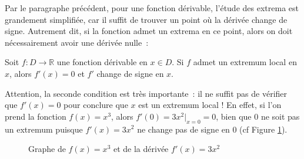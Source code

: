 Par le paragraphe précédent, pour une fonction dérivable, l'étude des extrema est grandement simplifiée, car il suffit de trouver un point où la dérivée change de signe. Autrement dit, si la fonction admet un extrema en ce point, alors on doit nécessairement avoir une dérivée nulle~:
\begin{boxthm}
Soit $f : D \to \mathbb{R}$ une fonction dérivable en $x \in D$. Si $f$ admet un extremum local en $x$, alors $f'(x) = 0$ et $f'$ change de signe en $x$.
\end{boxthm}
Attention, la seconde condition est très importante~: il ne suffit pas de vérifier que $f'(x) = 0$ pour conclure que $x$ est un extremum local ! En effet, si l'on prend la fonction $f(x) = x^3$, alors $f'(0) = 3x^2\big|_{x = 0} = 0$, bien que $0$ ne soit pas un extremum puisque $f'(x) = 3x^2$ ne change pas de signe en $0$ (cf Figure \ref{fig:x_cubed}).
\begin{figure}[H]
    \centering
    \caption{Graphe de $f(x) = x^3$ et de la dérivée $f'(x) = 3x^2$}
    \label{fig:x_cubed}
\end{figure}

